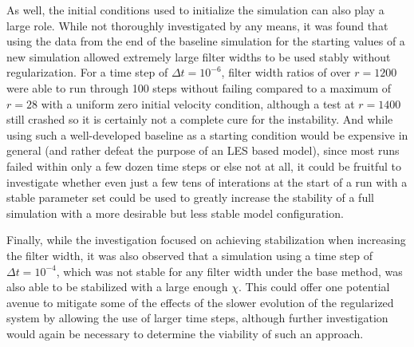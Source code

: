 As well, the initial conditions used to initialize the simulation can also play a large role. While not thoroughly investigated by any means, it was found that using the data from the end of the baseline simulation for the starting values of a new simulation allowed extremely large filter widths to be used stably without regularization. For a time step of $\Delta t=10^{-6}$, filter width ratios of over $r=1200$ were able to run through 100 steps without failing compared to a maximum of $r=28$ with a uniform zero initial velocity condition, although a test at $r=1400$ still crashed so it is certainly not a complete cure for the instability. And while using such a well-developed baseline as a starting condition would be expensive in general (and rather defeat the purpose of an LES based model), since most runs failed within only a few dozen time steps or else not at all, it could be fruitful to investigate whether even just a few tens of interations at the start of a run with a stable parameter set could be used to greatly increase the stability of a full simulation with a more desirable but less stable model configuration.

Finally, while the investigation focused on achieving stabilization when increasing the filter width, it was also observed that a simulation using a time step of $\Delta t=10^{-4}$, which was not stable for any filter width under the base method, was also able to be stabilized with a large enough $\chi$. This could offer one potential avenue to mitigate some of the effects of the slower evolution of the regularized system by allowing the use of larger time steps, although further investigation would again be necessary to determine the viability of such an approach.